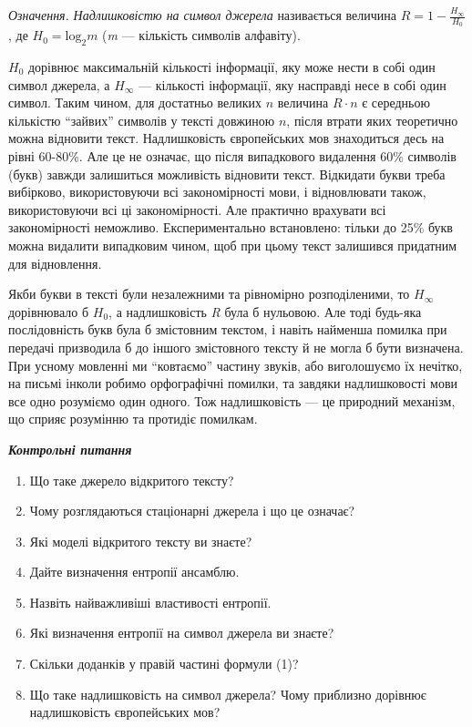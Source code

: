 \textit{Означення.} \textit{Надлишковістю на символ джерела} називається
величина  ${R=1-\frac{H_{{\infty }}}{H_{{0}}}}$, де 
${H_{{0}}=\text{log}_{{2}}m}$ (\textit{m} --- кількість символів алфавіту).

 ${H_{{0}}}$ дорівнює максимальній кількості інформації, яку може нести в собі
один символ джерела, а  ${H_{{\infty }}}$ --- кількості інформації, яку насправді
несе в собі один символ. Таким чином, для достатньо великих  ${n}$ величина 
${R\cdot n}$ є середньою кількістю “зайвих” символів у тексті довжиною  ${n}$,
після втрати яких теоретично можна відновити текст. Надлишковість європейських
мов знаходиться десь на рівні 60-80\%. Але це не означає, що після випадкового
видалення 60\% символів (букв) завжди залишиться можливість відновити текст.
Відкидати букви треба вибірково, використовуючи всі закономірності мови, і
відновлювати також, використовуючи всі ці закономірності. Але практично
врахувати всі закономірності неможливо. Експериментально встановлено: тільки до
25\% букв можна видалити випадковим чином, щоб при цьому текст залишився
придатним для відновлення.

Якби букви в тексті були незалежними та рівномірно розподіленими, то 
${H_{{\infty }}}$ дорівнювало б  ${H_{{0}}}$, а надлишковість  \textit{R} була
б нульовою. Але тоді будь-яка послідовність букв була б змістовним текстом, і
навіть найменша помилка при передачі  призводила б до іншого змістовного тексту
й не могла б бути визначена. При усному мовленні ми “ковтаємо” частину звуків,
або виголошуємо їх нечітко, на письмі інколи робимо орфографічні помилки, та
завдяки  надлишковості мови все одно розуміємо один одного. Тож надлишковість ---
це природний механізм, що сприяє розумінню та протидіє помилкам.


\bigskip


\bigskip

{\centering\bfseries\itshape
Контрольні питання
\par}


\bigskip


\bigskip

\liststyleWWviiiNumxii
\begin{enumerate}
\item Що таке джерело відкритого тексту?
\item Чому розглядаються стаціонарні джерела і що це означає?
\item Які моделі відкритого тексту ви знаєте?
\item Дайте визначення ентропії ансамблю.
\item Назвіть найважливіші властивості ентропії.
\item Які визначення ентропії на символ джерела ви знаєте?
\item Скільки доданків у правій частині формули (1)?
\item Що таке надлишковість на символ джерела? Чому приблизно дорівнює
надлишковість європейських мов?
\end{enumerate}

